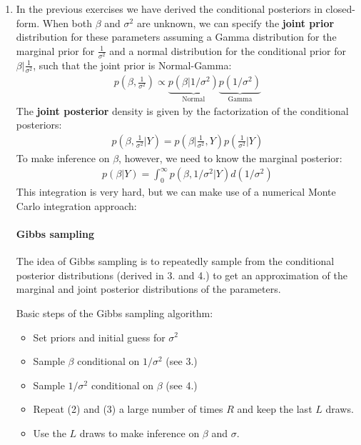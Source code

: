 \begin{enumerate}
\item In the previous exercises we have derived the conditional posteriors in closed-form.
When both \(\beta \) and \(\sigma^2\) are unknown,
  we can specify the \textbf{joint prior} distribution for these parameters assuming a Gamma distribution for the marginal prior for \(\frac{1}{\sigma^2}\)
  and a normal distribution for the conditional prior for \(\beta|\frac{1}{\sigma^2}\),
  such that the joint prior is Normal-Gamma:
\begin{align*}
p\left(\beta, \frac{1}{\sigma^2}\right) \propto \underbrace{p(\beta|1/\sigma^2)}_{\text{Normal}} \underbrace{p\left(1/\sigma^2\right)}_{\text{Gamma}}
\end{align*}
The \textbf{joint posterior} density is given by the factorization of the conditional posteriors:
\begin{align*}
p\left(\beta,\frac{1}{\sigma^2}|Y\right) = p\left(\beta|\frac{1}{\sigma^2},Y\right) p\left(\frac{1}{\sigma^2}|Y\right)
\end{align*}
To make inference on \(\beta \), however, we need to know the marginal posterior:
\begin{align*}
p(\beta|Y) = \int_0^\infty p(\beta,1/\sigma^2|Y) d(1/\sigma^2)
\end{align*}
This integration is very hard, but we can make use of a numerical Monte Carlo integration approach:

\paragraph{Gibbs sampling}
The idea of Gibbs sampling is to repeatedly sample from the conditional posterior distributions (derived in {3.} and {4.})
  to get an approximation of the marginal and joint posterior distributions of the parameters.

Basic steps of the Gibbs sampling algorithm:
\begin{itemize}
\item Set priors and initial guess for \(\sigma^2\)
\item Sample \(\beta \) conditional on \(1/\sigma^2\) (see {3.})
\item Sample \(1/\sigma^2\) conditional on \(\beta \) (see {4.})
\item Repeat (2) and (3) a large number of times \(R\) and keep the last \(L\) draws.
\item Use the \(L\) draws to make inference on \(\beta \) and \(\sigma \).
\end{itemize}

\end{enumerate}